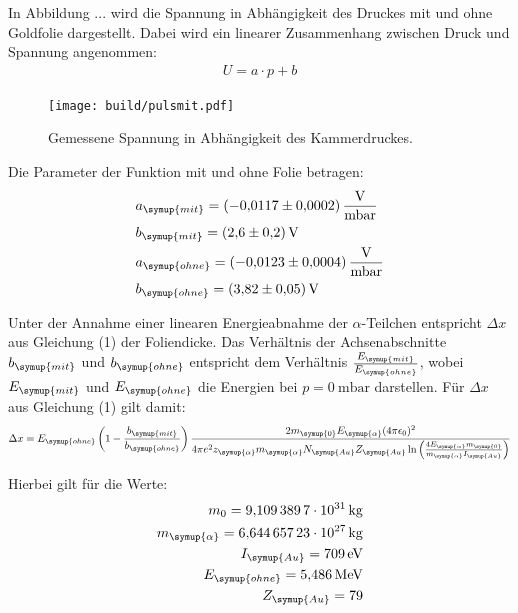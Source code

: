 In Abbildung ... wird  die Spannung in Abhängigkeit des Druckes mit und ohne Goldfolie dargestellt. Dabei wird ein linearer
Zusammenhang zwischen Druck und Spannung angenommen:
\begin{align*}
  U = a \cdot p + b
\end{align*}

\begin{figure}[H]
  \centering
  \texttt{[image: build/pulsmit.pdf]}
  \caption{Gemessene Spannung in Abhängigkeit des Kammerdruckes.}
  \label{fig:ohne}
\end{figure}

Die Parameter der Funktion mit und ohne Folie betragen:
\begin{align*}
  &a_{\symup{mit}} = \SI{-0.0117(2)}{\volt\per\milli\bar}  \\
  &b_{\symup{mit}} = \SI{2.6(2)}{\volt}  \\
  &a_{\symup{ohne}}= \SI{-0.0123(4)}{\volt\per\milli\bar}  \\
  &b_{\symup{ohne}} = \SI{ 3.82(5)}{\volt} \\
\end{align*}

Unter der Annahme einer linearen Energieabnahme der $\alpha$-Teilchen entspricht $\Delta x$ aus Gleichung (1) der Foliendicke.
Das Verhältnis der Achsenabschnitte $b_{\symup{mit}}$ und $b_{\symup{ohne}}$ entspricht dem Verhältnis $\frac{E_{\symup{mit}}}{E_{\symup{ohne}}}$, wobei
$E_{\symup{mit}}$ und $E_{\symup{ohne}}$ die Energien bei $p=\SI{0}{\milli\bar}$ darstellen.
Für $\Delta x$ aus Gleichung (1) gilt damit:
\begin{align}
  \Delta x = E_{\symup{ohne}} \left(1- \frac{b_{\symup{mit}}}{b_{\symup{ohne}}}\right) \frac{2 m_{\symup{0}} E_{\symup{\alpha}} (4 \pi \epsilon_0)^2}{4 \pi e^2 z_{\symup{\alpha}}  m_{\symup{\alpha}} N_{\symup{Au}} Z_{\symup{Au}} \ln{\left(\frac{4 E_{\symup{\alpha}} m_{\symup{0}}}{m_{\symup{\alpha}} I_{\symup{Au}}}\right)}}
\end{align}

Hierbei gilt für die Werte:
\begin{align*}
  m_0= \SI{9.1093897e31}{\kilo\gram} \\
  m_{\symup{\alpha}} = \SI{6.64465723e27}{\kilo\gram} \\
  I_{\symup{Au}} = \SI{709}{\eV} \\
  E_{\symup{ohne}} = \SI{5.486}{\mega\eV} \\
  Z_{\symup{Au}} = 79
\end{align*}

